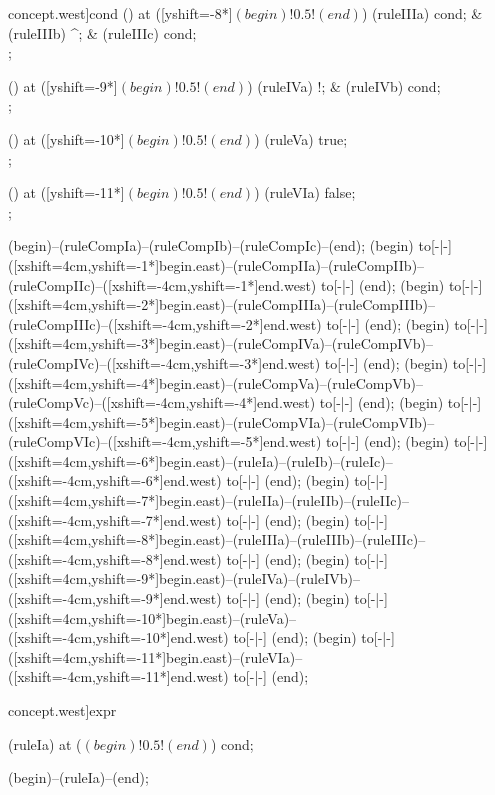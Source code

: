 \begin{syntax}[[xshift=16mm]concept.west]{cond}
  \node[sequence] () at ([yshift=-8*\syntaxruledist]$(begin)!0.5!(end)$) {
    \node[nonterminal] (ruleIIIa) {cond};
    &
    \node[terminal]    (ruleIIIb) {\^{}};
    &
    \node[nonterminal] (ruleIIIc) {cond};
    \\
  };
  
  \node[sequence] () at ([yshift=-9*\syntaxruledist]$(begin)!0.5!(end)$) {
    \node[terminal]    (ruleIVa) {!};
    &
    \node[nonterminal] (ruleIVb) {cond};
    \\
  };
  
  \node[sequence] () at ([yshift=-10*\syntaxruledist]$(begin)!0.5!(end)$) {
    \node[terminal]    (ruleVa) {true};
    \\
  };
  
  \node[sequence] () at ([yshift=-11*\syntaxruledist]$(begin)!0.5!(end)$) {
    \node[terminal]    (ruleVIa) {false};
    \\
  };
  
  \draw[path] (begin)--(ruleCompIa)--(ruleCompIb)--(ruleCompIc)--(end);
  \draw[path] (begin) to[-|-] ([xshift=4cm,yshift=-1*\syntaxruledist]begin.east)--(ruleCompIIa)--(ruleCompIIb)--(ruleCompIIc)--([xshift=-4cm,yshift=-1*\syntaxruledist]end.west) to[-|-] (end);
  \draw[path] (begin) to[-|-] ([xshift=4cm,yshift=-2*\syntaxruledist]begin.east)--(ruleCompIIIa)--(ruleCompIIIb)--(ruleCompIIIc)--([xshift=-4cm,yshift=-2*\syntaxruledist]end.west) to[-|-] (end);
  \draw[path] (begin) to[-|-] ([xshift=4cm,yshift=-3*\syntaxruledist]begin.east)--(ruleCompIVa)--(ruleCompIVb)--(ruleCompIVc)--([xshift=-4cm,yshift=-3*\syntaxruledist]end.west) to[-|-] (end);
  \draw[path] (begin) to[-|-] ([xshift=4cm,yshift=-4*\syntaxruledist]begin.east)--(ruleCompVa)--(ruleCompVb)--(ruleCompVc)--([xshift=-4cm,yshift=-4*\syntaxruledist]end.west) to[-|-] (end);
  \draw[path] (begin) to[-|-] ([xshift=4cm,yshift=-5*\syntaxruledist]begin.east)--(ruleCompVIa)--(ruleCompVIb)--(ruleCompVIc)--([xshift=-4cm,yshift=-5*\syntaxruledist]end.west) to[-|-] (end);
  \draw[path] (begin) to[-|-] ([xshift=4cm,yshift=-6*\syntaxruledist]begin.east)--(ruleIa)--(ruleIb)--(ruleIc)--([xshift=-4cm,yshift=-6*\syntaxruledist]end.west) to[-|-] (end);
  \draw[path] (begin) to[-|-] ([xshift=4cm,yshift=-7*\syntaxruledist]begin.east)--(ruleIIa)--(ruleIIb)--(ruleIIc)--([xshift=-4cm,yshift=-7*\syntaxruledist]end.west) to[-|-] (end);
  \draw[path] (begin) to[-|-] ([xshift=4cm,yshift=-8*\syntaxruledist]begin.east)--(ruleIIIa)--(ruleIIIb)--(ruleIIIc)--([xshift=-4cm,yshift=-8*\syntaxruledist]end.west) to[-|-] (end);
  \draw[path] (begin) to[-|-] ([xshift=4cm,yshift=-9*\syntaxruledist]begin.east)--(ruleIVa)--(ruleIVb)--([xshift=-4cm,yshift=-9*\syntaxruledist]end.west) to[-|-] (end);
  \draw[path] (begin) to[-|-] ([xshift=4cm,yshift=-10*\syntaxruledist]begin.east)--(ruleVa)--([xshift=-4cm,yshift=-10*\syntaxruledist]end.west) to[-|-] (end);
  \draw[path] (begin) to[-|-] ([xshift=4cm,yshift=-11*\syntaxruledist]begin.east)--(ruleVIa)--([xshift=-4cm,yshift=-11*\syntaxruledist]end.west) to[-|-] (end);
\end{syntax}
\begin{syntax}[[xshift=16mm]concept.west]{expr}
  
  \node[nonterminal] (ruleIa) at ($(begin)!0.5!(end)$) {cond};
  
  \draw[path] (begin)--(ruleIa)--(end);
\end{syntax}

